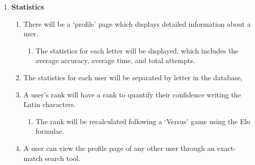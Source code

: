 \documentclass{article}
\begin{document}
\begin{enumerate}
\begin{enumerate}
\begin{enumerate}
\begin{enumerate}
                \item After each round, the user with the fastest time will win the round. If one player is incorrect then the other player will be given the win. If both players are incorrect then neither of them win.
                \item After each round the users will be given their time and accuracy, and the user who won the round will be displayed.
            \end{enumerate}
            \item \textbf{An elimination game of 12 users}
            \begin{enumerate}
                \item After each round the users who are incorrect will be eliminated  and given the option to return to home. If all of the submissions are correct then the user with the longest time will be eliminated instead. If none are correct then no user will be eliminated.
                \item After each round the users will be given their time and accuracy, and the list of alive and eliminated users will be updated.
                \item The last user remaining is the winner and the game will end when this occurs.
                \item The next round of the game will start when all of the alive users are ready, and will ignore any eliminated users.
            \end{enumerate}
        \end{enumerate}
    \end{enumerate}    

    \item \textbf{Statistics}
    \begin{enumerate}
        \item There will be a `profile' page which displays detailed information about a user.
        \begin{enumerate}
            \item The statistics for each letter will be displayed, which includes the average accuracy, average time, and total attempts.
        \end{enumerate}
        \item The statistics for each user will be separated by letter in the database, 
        \item A user's rank will have a rank to quantify their confidence writing the Latin characters.
        \begin{enumerate}
            \item The rank will be recalculated following a `Versus' game using the Elo formulae.
        \end{enumerate}
        \item A user can view the profile page of any other user through an exact-match search tool.
    \end{enumerate}


\end{enumerate}
\end{document}
